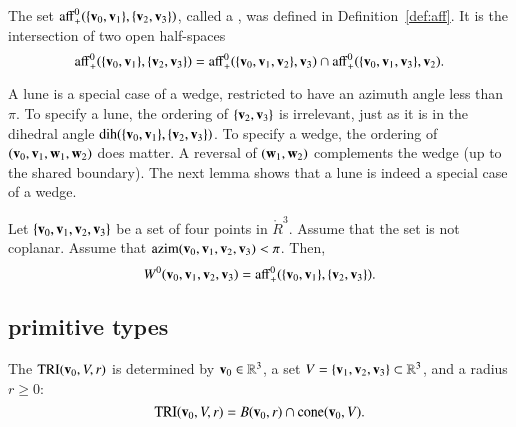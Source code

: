 \begin{definition}[lune]
The set ${\operatorname{aff}}^0_+(\{{\mathbf v}_0,{\mathbf v}_1\},\{{\mathbf v}_2,{\mathbf v}_3\})$, called a , was defined
in Definition~\ref{def:aff}.  It is the intersection
of two open half-spaces
\[ 
{\operatorname{aff}}^0_+(\{{\mathbf v}_0,{\mathbf v}_1\},\{{\mathbf v}_2,{\mathbf v}_3\})
={\operatorname{aff}}^0_+(\{{\mathbf v}_0,{\mathbf v}_1,{\mathbf v}_2\},{\mathbf v}_3)\cap
{\operatorname{aff}}^0_+(\{{\mathbf v}_0,{\mathbf v}_1,{\mathbf v}_3\},{\mathbf v}_2).
\] 
\end{definition}

A lune is a special case of a wedge, restricted to have an azimuth angle
less than $\pi$.  To specify a lune, the ordering of $\{{\mathbf v}_2,{\mathbf v}_3\}$
is irrelevant, just as it is in the dihedral angle 
$\operatorname{dih}(\{{\mathbf v}_0,{\mathbf v}_1\},\{{\mathbf v}_2,{\mathbf v}_3\})$.  To specify a wedge, the ordering
of $({\mathbf v}_0,{\mathbf v}_1,{\mathbf w}_1,{\mathbf w}_2)$ does matter.  A reversal of $({\mathbf w}_1,{\mathbf w}_2)$ complements
the wedge (up to the shared boundary).  The next lemma shows that
a lune is indeed a special case of a wedge.
%
%
%
%
%
%

\begin{lemma} Let $\{{\mathbf v}_0,{\mathbf v}_1,{\mathbf v}_2,{\mathbf v}_3\}$ be a set of four points
in $\ring{R}^3$.  Assume that the set is not coplanar.  Assume that
${\operatorname{azim}}({\mathbf v}_0,{\mathbf v}_1,{\mathbf v}_2,{\mathbf v}_3)<\pi$.  Then,
\[ W^0({\mathbf v}_0,{\mathbf v}_1,{\mathbf v}_2,{\mathbf v}_3) =
{\operatorname{aff}}^0_+(\{{\mathbf v}_0,{\mathbf v}_1\},\{{\mathbf v}_2,{\mathbf v}_3\}).\] 
%
\end{lemma}


\subsection{primitive types}
%

\begin{definition}
 The 
${\operatorname{TRI}}({\mathbf v}_0,V,r)$ is determined by ${\mathbf v}_0\in\mathbb{R}^3$, a 
set $V=\{{\mathbf v}_1,{\mathbf v}_2,{\mathbf v}_3\}\subset\mathbb{R}^3$, and a radius $r\ge0$:
\[ 
{\operatorname{TRI}}({\mathbf v}_0,V,r) = 
B({\mathbf v}_0,r)\cap {\operatorname{cone}}({\mathbf v}_0,V).
\] 
%
%
%
\end{definition}



